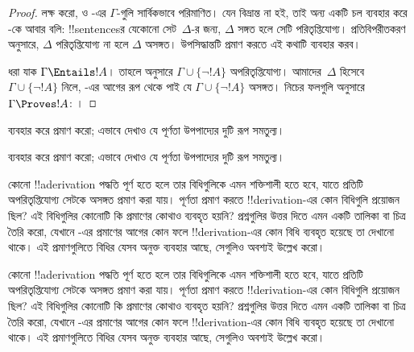 \documentclass[../../../include/open-logic-section]{subfiles}
\begin{document}
\begin{proof}
লক্ষ করো,  ও -এর
$\Gamma$-গুলি সার্বিকভাবে পরিমাণিত। যেন বিভ্রান্ত না হই, তাই অন্য একটি
চল ব্যবহার করে -কে আবার বলি: !!{sentence}sর
যেকোনো সেট~$\Delta$-র জন্য, $\Delta$ সঙ্গত হলে সেটি পরিতৃপ্তিযোগ্য।
প্রতিবিপরীতকরণ অনুসারে, $\Delta$ পরিতৃপ্তিযোগ্য না হলে $\Delta$ অসঙ্গত।
উপসিদ্ধান্তটি প্রমাণ করতে এই কথাটি ব্যবহার করব।

ধরা যাক $\Gamma \Entails !A$। তাহলে 
অনুসারে $\Gamma \cup \{\lnot !A\}$ অপরিতৃপ্তিযোগ্য। আমাদের~$\Delta$
হিসেবে $\Gamma \cup \{\lnot !A\}$ নিলে, -এর
আগের রূপ থেকে পাই যে $\Gamma \cup \{\lnot !A\}$ অসঙ্গত। নিচের ফলগুলি
অনুসারে $\Gamma \Proves !A$:
।
\end{proof}

\begin{prob}
 ব্যবহার করে
 প্রমাণ করো; এভাবে দেখাও যে
পূর্ণতা উপপাদ্যের দুটি রূপ সমতুল্য।
\end{prob}
\tagendprob

\begin{prob}
 ব্যবহার করে
 প্রমাণ করো; এভাবে দেখাও যে
পূর্ণতা উপপাদ্যের দুটি রূপ সমতুল্য।
\end{prob}
\tagendprob

\begin{prob}
কোনো !!a{derivation} পদ্ধতি পূর্ণ হতে হলে তার বিধিগুলিকে এমন শক্তিশালী
হতে হবে, যাতে প্রতিটি অপরিতৃপ্তিযোগ্য সেটকে অসঙ্গত প্রমাণ করা যায়। পূর্ণতা
প্রমাণ করতে !!{derivation}-এর কোন বিধিগুলি প্রয়োজন ছিল? এই বিধিগুলির
কোনোটি কি প্রমাণের কোথাও ব্যবহৃত হয়নি? প্রশ্নগুলির উত্তর দিতে এমন একটি
তালিকা বা চিত্র তৈরি করো, যেখানে
-এর প্রমাণের আগের কোন ফলে
!!{derivation}-এর কোন বিধি ব্যবহৃত হয়েছে তা দেখানো থাকে। এই প্রমাণগুলিতে
বিধির যেসব অনুক্ত ব্যবহার আছে, সেগুলিও অবশ্যই উল্লেখ করো।
\end{prob}
\tagendprob

\begin{prob}
কোনো !!a{derivation} পদ্ধতি পূর্ণ হতে হলে তার বিধিগুলিকে এমন শক্তিশালী
হতে হবে, যাতে প্রতিটি অপরিতৃপ্তিযোগ্য সেটকে অসঙ্গত প্রমাণ করা যায়। পূর্ণতা
প্রমাণ করতে !!{derivation}-এর কোন বিধিগুলি প্রয়োজন ছিল? এই বিধিগুলির
কোনোটি কি প্রমাণের কোথাও ব্যবহৃত হয়নি? প্রশ্নগুলির উত্তর দিতে এমন একটি
তালিকা বা চিত্র তৈরি করো, যেখানে
-এর প্রমাণের আগের কোন ফলে
!!{derivation}-এর কোন বিধি ব্যবহৃত হয়েছে তা দেখানো থাকে। এই প্রমাণগুলিতে
বিধির যেসব অনুক্ত ব্যবহার আছে, সেগুলিও অবশ্যই উল্লেখ করো।
\end{prob}
\tagendprob
\end{document}
